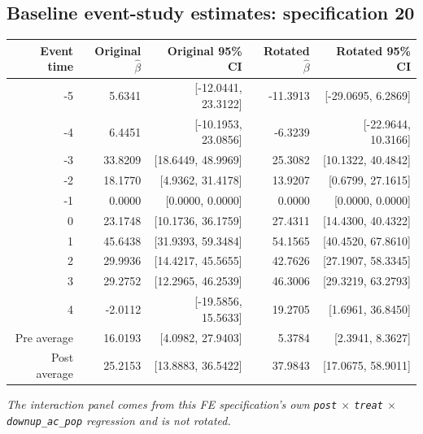 \documentclass[10pt]{article}
\begin{document}
\subsection*{Baseline event-study estimates: specification 20}
\begin{center}
\scriptsize
\begin{tabular}{r rr rr}
\toprule
Event time & Original $\hat\beta$ & Original 95\% CI & Rotated $\hat\beta$ & Rotated 95\% CI \\
\midrule
-5 & 5.6341 & [-12.0441, 23.3122] & -11.3913 & [-29.0695, 6.2869] \\
-4 & 6.4451 & [-10.1953, 23.0856] & -6.3239 & [-22.9644, 10.3166] \\
-3 & 33.8209 & [18.6449, 48.9969] & 25.3082 & [10.1322, 40.4842] \\
-2 & 18.1770 & [4.9362, 31.4178] & 13.9207 & [0.6799, 27.1615] \\
-1 & 0.0000 & [0.0000, 0.0000] & 0.0000 & [0.0000, 0.0000] \\
0 & 23.1748 & [10.1736, 36.1759] & 27.4311 & [14.4300, 40.4322] \\
1 & 45.6438 & [31.9393, 59.3484] & 54.1565 & [40.4520, 67.8610] \\
2 & 29.9936 & [14.4217, 45.5655] & 42.7626 & [27.1907, 58.3345] \\
3 & 29.2752 & [12.2965, 46.2539] & 46.3006 & [29.3219, 63.2793] \\
4 & -2.0112 & [-19.5856, 15.5633] & 19.2705 & [1.6961, 36.8450] \\
\midrule
Pre average & 16.0193 & [4.0982, 27.9403] & 5.3784 & [2.3941, 8.3627] \\
Post average & 25.2153 & [13.8883, 36.5422] & 37.9843 & [17.0675, 58.9011] \\
\bottomrule
\end{tabular}
\end{center}
\medskip
\textit{The interaction panel comes from this FE specification's own \texttt{post} $\times$ \texttt{treat} $\times$ \texttt{downup\_ac\_pop} regression and is not rotated.}
\clearpage
\end{document}
